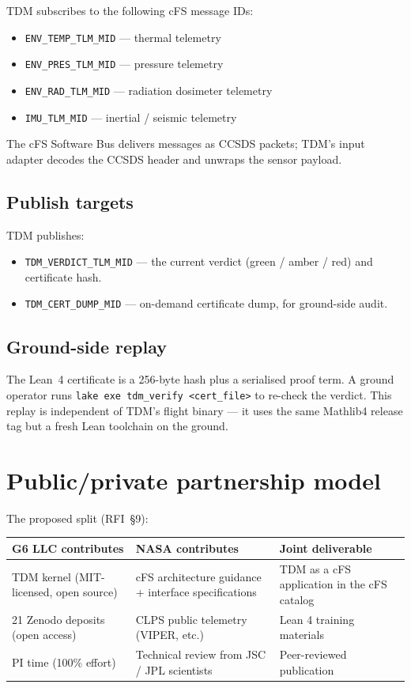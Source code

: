 \documentclass[11pt,a4paper]{article}
\begin{document}
TDM subscribes to the following cFS message IDs:
\begin{itemize}
  \item \texttt{ENV\_TEMP\_TLM\_MID} --- thermal telemetry
  \item \texttt{ENV\_PRES\_TLM\_MID} --- pressure telemetry
  \item \texttt{ENV\_RAD\_TLM\_MID} --- radiation dosimeter telemetry
  \item \texttt{IMU\_TLM\_MID} --- inertial / seismic telemetry
\end{itemize}
The cFS Software Bus delivers messages as CCSDS packets; TDM's input
adapter decodes the CCSDS header and unwraps the sensor payload.

\subsection{Publish targets}

TDM publishes:
\begin{itemize}
  \item \texttt{TDM\_VERDICT\_TLM\_MID} --- the current verdict
    (green / amber / red) and certificate hash.
  \item \texttt{TDM\_CERT\_DUMP\_MID} --- on-demand certificate dump, for
    ground-side audit.
\end{itemize}

\subsection{Ground-side replay}

The Lean~4 certificate is a 256-byte hash plus a serialised proof term.
A ground operator runs
\texttt{lake exe tdm\_verify \textless cert\_file\textgreater}
to re-check the verdict.  This replay is independent of TDM's flight
binary --- it uses the same Mathlib4 release tag but a fresh Lean
toolchain on the ground.

\section{Public/private partnership model}

The proposed split (RFI~\S9):

\begin{tabular}{p{4cm}p{4.5cm}p{6cm}}
\toprule
\textbf{G6 LLC contributes} & \textbf{NASA contributes} & \textbf{Joint deliverable} \\
\midrule
TDM kernel (MIT-licensed, open source) & cFS architecture guidance + interface specifications & TDM as a cFS application in the cFS catalog \\
21 Zenodo deposits (open access)        & CLPS public telemetry (VIPER, etc.)              & Lean 4 training materials \\
PI time (100\% effort)                  & Technical review from JSC / JPL scientists       & Peer-reviewed publication \\
\bottomrule
\end{tabular}
\end{document}

